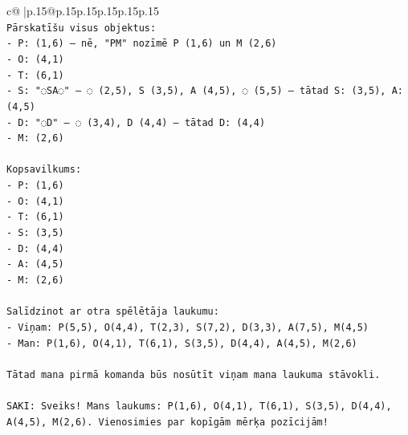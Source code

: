 \documentclass{article}
\begin{document}
{\begin{supertabular}{c@{$\;$}|p{.15\linewidth}@{}p{.15\linewidth}p{.15\linewidth}p{.15\linewidth}p{.15\linewidth}p{.15\linewidth}}
{{{\\ 
\texttt{Pārskatīšu visus objektus:} \\
\texttt{{-} P: (1,6) — nē, "PM" nozīmē P (1,6) un M (2,6)} \\
\texttt{{-} O: (4,1)} \\
\texttt{{-} T: (6,1)} \\
\texttt{{-} S: "◌SA◌" — ◌ (2,5), S (3,5), A (4,5), ◌ (5,5) — tātad S: (3,5), A: (4,5)} \\
\texttt{{-} D: "◌D" — ◌ (3,4), D (4,4) — tātad D: (4,4)} \\
\texttt{{-} M: (2,6)} \\
\\ 
\texttt{Kopsavilkums:} \\
\texttt{{-} P: (1,6)} \\
\texttt{{-} O: (4,1)} \\
\texttt{{-} T: (6,1)} \\
\texttt{{-} S: (3,5)} \\
\texttt{{-} D: (4,4)} \\
\texttt{{-} A: (4,5)} \\
\texttt{{-} M: (2,6)} \\
\\ 
\texttt{Salīdzinot ar otra spēlētāja laukumu:} \\
\texttt{{-} Viņam: P(5,5), O(4,4), T(2,3), S(7,2), D(3,3), A(7,5), M(4,5)} \\
\texttt{{-} Man: P(1,6), O(4,1), T(6,1), S(3,5), D(4,4), A(4,5), M(2,6)} \\
\\ 
\texttt{Tātad mana pirmā komanda būs nosūtīt viņam mana laukuma stāvokli.} \\
\\ 
\texttt{SAKI: Sveiks! Mans laukums: P(1,6), O(4,1), T(6,1), S(3,5), D(4,4), A(4,5), M(2,6). Vienosimies par kopīgām mērķa pozīcijām!} \\
            }
        }
    }
     \\ \\


\end{supertabular}}
\end{document}
